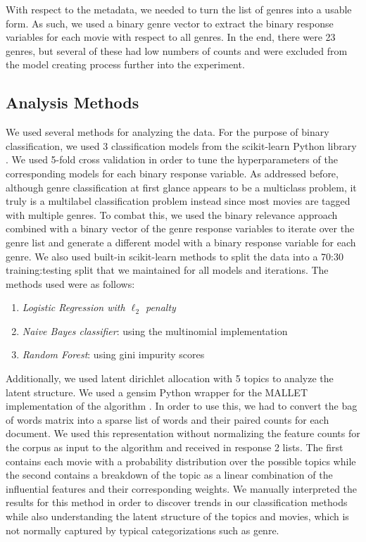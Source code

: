 \documentclass{article} %
\begin{document}
With respect to the metadata, we needed to turn the list of genres into a usable form. As such, we used a binary genre vector to extract the binary response variables for each movie with respect to all genres. In the end, there were 23 genres, but several of these had low numbers of counts and were excluded from the model creating process further into the experiment.

\subsection{Analysis Methods}

We used several methods for analyzing the data. For the purpose of binary classification, we used 3 classification models from the scikit-learn Python library \cite{skl}. We used 5-fold cross validation in order to tune the hyperparameters of the corresponding models for each binary response variable. As addressed before, although genre classification at first glance appears to be a multiclass problem, it truly is a multilabel classification problem instead since most movies are tagged with multiple genres. To combat this, we used the binary relevance approach combined with a binary vector of the genre response variables to iterate over the genre list and generate a different model with a binary response variable for each genre. We also used built-in scikit-learn methods to split the data into a 70:30 training:testing split that we maintained for all models and iterations. The methods used were as follows:
\begin{enumerate}
\item \textit{Logistic Regression with $\ell_2$ penalty}
\item \textit{Naive Bayes classifier}: using the multinomial implementation
\item \textit{Random Forest}: using gini impurity scores
\end{enumerate}

Additionally, we used latent dirichlet allocation with 5 topics to analyze the latent structure. We used a gensim Python wrapper for the MALLET implementation of the algorithm \cite{mallet} \cite{gensim}. In order to use this, we had to convert the bag of words matrix into a sparse list of words and their paired counts for each document. We used this representation without normalizing the feature counts for the corpus as input to the algorithm and received in response 2 lists. The first contains each movie with a probability distribution over the possible topics while the second contains a breakdown of the topic as a linear combination of the influential features and their corresponding weights. We manually interpreted the results for this method in order to discover trends in our classification methods while also understanding the latent structure of the topics and movies, which is not normally captured by typical categorizations such as genre.
\end{document}
